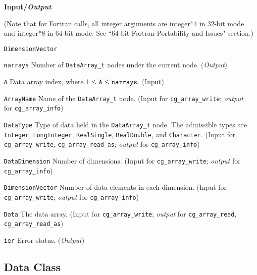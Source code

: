 \noindent
\textbf{\textcolor{input}{Input}/\textcolor{output}{\textit{Output}}}

\noindent (Note that for Fortran calls, all integer arguments are integer*4 in 32-bit mode and integer*8 in 64-bit mode.
See ``64-bit Fortran Portability and Issues" section.)

\begin{Ventryi}{\texttt{DimensionVector}}\raggedright
\item [\texttt{narrays}]
      Number of \texttt{DataArray\_t} nodes under the current node.
      (\textcolor{output}{\textit{Output}})
\item [\texttt{A}]
      Data array index, where $1 \leq \text{\texttt{A}} \leq \text{\texttt{narrays}}$.
      (\textcolor{input}{Input})
\item [\texttt{ArrayName}]
      Name of the \texttt{DataArray\_t} node.
      (\textcolor{input}{Input} for \texttt{cg\_array\_write};
      \textcolor{output}{\textit{output}} for \texttt{cg\_array\_info})
\item [\texttt{DataType}]
      Type of data held in the \texttt{DataArray\_t} node.
      The admissible types are \texttt{Integer}, \texttt{LongInteger},
      \texttt{RealSingle}, \texttt{RealDouble}, and \texttt{Character}.
      (\textcolor{input}{Input} for \texttt{cg\_array\_write},
      \texttt{cg\_array\_read\_as}; \textcolor{output}{\textit{output}} for
      \texttt{cg\_array\_info})
\item [\texttt{DataDimension}]
      Number of dimensions.
      (\textcolor{input}{Input} for \texttt{cg\_array\_write};
      \textcolor{output}{\textit{output}} for \texttt{cg\_array\_info})
\item [\texttt{DimensionVector}]
      Number of data elements in each dimension.
      (\textcolor{input}{Input} for \texttt{cg\_array\_write};
      \textcolor{output}{\textit{output}} for \texttt{cg\_array\_info})
\item [\texttt{Data}]
      The data array.
      (\textcolor{input}{Input} for \texttt{cg\_array\_write};
      \textcolor{output}{\textit{output}} for \texttt{cg\_array\_read},
      \texttt{cg\_array\_read\_as})
\item [\texttt{ier}]
      Error status.
      (\textcolor{output}{\textit{Output}})
\end{Ventryi}

\newpage
\subsection{Data Class}
\label{s:dataclass}

